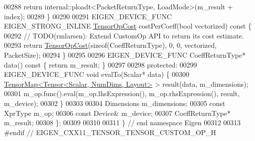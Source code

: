 \begin{DoxyCode}
00288     \textcolor{keywordflow}{return} internal::ploadt<PacketReturnType, LoadMode>(m\_result + index);
00289   \}
00290 
00291   EIGEN\_DEVICE\_FUNC EIGEN\_STRONG\_INLINE \hyperlink{class_eigen_1_1_tensor_op_cost}{TensorOpCost} costPerCoeff(\textcolor{keywordtype}{bool} vectorized)\textcolor{keyword}{ const }\{
00292     \textcolor{comment}{// TODO(rmlarsen): Extend CustomOp API to return its cost estimate.}
00293     \textcolor{keywordflow}{return} \hyperlink{class_eigen_1_1_tensor_op_cost}{TensorOpCost}(\textcolor{keyword}{sizeof}(CoeffReturnType), 0, 0, vectorized, PacketSize);
00294   \}
00295 
00296   EIGEN\_DEVICE\_FUNC CoeffReturnType* data()\textcolor{keyword}{ const }\{ \textcolor{keywordflow}{return} m\_result; \}
00297 
00298  \textcolor{keyword}{protected}:
00299   EIGEN\_DEVICE\_FUNC \textcolor{keywordtype}{void} evalTo(Scalar* data) \{
00300     \hyperlink{class_eigen_1_1_tensor_map}{TensorMap<Tensor<Scalar, NumDims, Layout>} > result(data, 
      m\_dimensions);
00301     m\_op.func().eval(m\_op.lhsExpression(), m\_op.rhsExpression(), result, m\_device);
00302   \}
00303 
00304   Dimensions m\_dimensions;
00305   \textcolor{keyword}{const} XprType m\_op;
00306   \textcolor{keyword}{const} Device& m\_device;
00307   CoeffReturnType* m\_result;
00308 \};
00309 
00310 
00311 \} \textcolor{comment}{// end namespace Eigen}
00312 
00313 \textcolor{preprocessor}{#endif // EIGEN\_CXX11\_TENSOR\_TENSOR\_CUSTOM\_OP\_H}
\end{DoxyCode}
